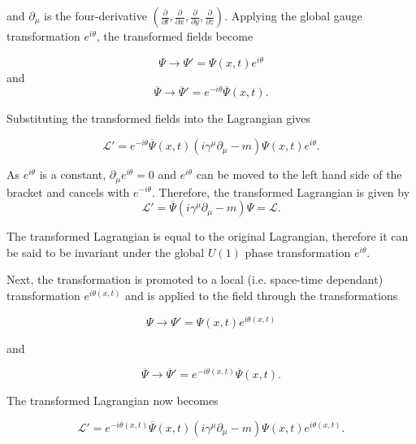\documentclass{article}
\begin{document}
and $\partial_\mu$ is the four-derivative $(\frac{\partial}{\partial t},\frac{\partial}{\partial x},\frac{\partial}{\partial y},\frac{\partial}{\partial z})$.
Applying the global gauge transformation $e^{i\theta}$, the transformed fields become

\begin{equation}
\label{eqn:abelianGlobalTransformation}
\Psi\rightarrow\Psi'=\Psi(x,t)e^{i\theta}
\end{equation}
and 
\begin{equation}
\overline{\Psi}\rightarrow\overline{\Psi}'=e^{-i\theta}\overline{\Psi}(x,t).
\end{equation}

Substituting the transformed fields into the Lagrangian gives

\begin{equation}
\label{eqn:transformedLagrangianGlobalAbelian}
\mathcal{L'} = e^{-i\theta}\overline{\Psi}(x,t)(i\gamma^\mu \partial_\mu - m)\Psi(x,t)e^{i\theta}.
\end{equation}

As $e^{i\theta}$ is a constant, $\partial_\mu e^{i\theta} = 0$ and $e^{i\theta}$ can be moved to the left hand side of the bracket and cancels with $e^{-i\theta}$. Therefore, the transformed Lagrangian is given by
\begin{equation}
\mathcal{L'} = \overline{\Psi} (i\gamma^\mu \partial_\mu - m)\Psi = \mathcal{L}.
\end{equation}

The transformed Lagrangian is equal to the original Lagrangian, therefore it can be said to be invariant under the global $U(1)$ phase transformation $e^{i\theta}$.

Next, the transformation is promoted to a local (i.e. space-time dependant) transformation $e^{i\theta(x,t)}$ and is applied to the field through the transformations

\begin{equation}
\label{eqn:abelianLocalTransformation}
\Psi\rightarrow\Psi'=\Psi(x,t)e^{i\theta(x,t)}
\end{equation}

and

\begin{equation}
\overline{\Psi}\rightarrow\overline{\Psi}'=e^{-i\theta(x,t)}\overline{\Psi}(x,t).
\end{equation}

The transformed Lagrangian now becomes

\begin{equation}
\mathcal{L'} = e^{-i\theta(x,t)}\overline{\Psi}(x,t)(i\gamma^\mu \partial_\mu - m)\Psi(x,t)e^{i\theta(x,t)}.
\end{equation}
\end{document}
